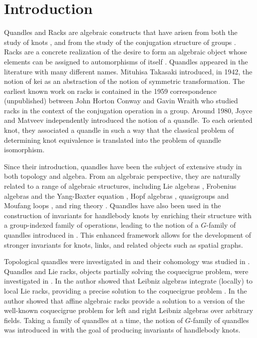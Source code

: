 \documentclass[12pt]{amsart}
\theoremstyle{plain}
\theoremstyle{definition}
\begin{document}
\section{Introduction}\label{intro}
Quandles and Racks are algebraic constructs that have arisen from both the study of knots \cite{Joyce, Matveev, EN}, and from the study of the conjugation structure of groups \cite{BES}. Racks are a concrete realization of the desire to form an algebraic object whose elements can be assigned to automorphisms of itself %
\cite{Brieskorn}. Quandles appeared in the literature with many different names.  Mituhisa Takasaki \cite{Takasaki} introduced, in 1942, the notion of kei as an abstraction of the notion of symmetric transformation.
The earliest known work on racks is contained in the 1959 correspondence (unpublished) between John Horton Conway and Gavin Wraith who studied
racks in the context of the conjugation operation in a group.  Around 1980, Joyce \cite{Joyce} and Matveev \cite{Matveev} independently introduced the notion of a quandle. To each oriented knot, they associated a quandle in such a way that the classical problem of determining knot equivalence is translated into the problem of quandle isomorphism. 

Since their introduction, quandles have been the subject of extensive study in both topology and algebra. From an algebraic perspective, they are naturally related to a range of algebraic structures, including Lie algebras \cite{CCES1, CCES2},  Frobenius algebras \cite{CCEKS} and the Yang-Baxter equation \cite{BES}, Hopf algebras \cite{And-Grana, CCES2}, quasigroups and Moufang loops \cite{Elhamdadi}, and ring theory \cite{EFT}. 
Quandles have also been used in the construction of invariants for handlebody knots by enriching their structure with a group-indexed family of operations, leading to the notion of a $G$-family of quandles introduced in \cite{IIJO}. This enhanced framework allows for the development of stronger invariants for knots, links, and related objects such as spatial graphs. 

Topological quandles were investigated in \cite{Rubinsztein} and their cohomology was studied in \cite{EM, ESZ}.  Quandles and Lie racks, objects partially solving the coquecigrue problem, were investigated in \cite{Kinyon}. In \cite{Covez} the author showed that
Leibniz algebras integrate (locally) to local Lie racks, providing a precise solution to the coquecigrue problem \cite{Loday}. In \cite{LucTa} the author showed that affine algebraic racks provide a solution to a version of the well-known coquecigrue problem for left and right Leibniz algebras over arbitrary fields.  Taking a family of quandles at a time, the notion of $G$-family of quandles was introduced in \cite{IIJO} with the goal of producing invariants of handlebody knots.   
\end{document}
